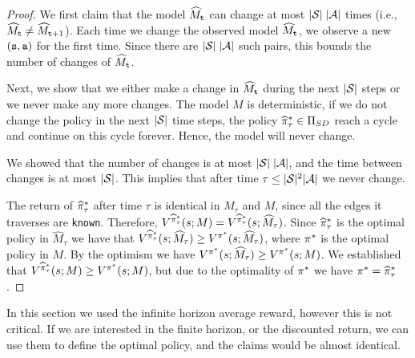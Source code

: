 \begin{proof}
We first claim that the model $\widehat{M}_{\tt t}$ can change  at
most $|\mathcal{S}|\;|\mathcal{A}|$ times (i.e.,  $\widehat{M}_{\tt t} \neq
\widehat{M}_{{\tt t}+1}$). Each time we change the observed model
$\widehat{M}_{\tt t}$, we observe a new $({\tt s},{\tt a})$ for the
first time. Since there are $|\mathcal{S}|\;|\mathcal{A}|$ such pairs, this
bounds the number of changes of  $\widehat{M}_{\tt t}$.

Next, we show that we either make a change in $\widehat{M}_{\tt t}$
during the next $|\mathcal{S}|$ steps or we never make any more changes.
The model $M$ is deterministic, if we do not change the policy in
the next $|\mathcal{S}|$ time steps, the policy
$\widehat{\pi}^*_\tau \in {\Pi _{SD}}$ reach a cycle and
continue on this cycle forever. Hence, the model will never change.

We showed that the number of changes is at most
$|\mathcal{S}|\;|\mathcal{A}|$, and the time between changes is at most
$|\mathcal{S}|$. This implies that after time $\tau\leq
|\mathcal{S}|^2|\mathcal{A}|$ we never change.

The return of $\widehat{\pi}^*_\tau$ after time $\tau$
is identical in $\widehat{M}_\tau$ and $M$, since all the edges
it traverses are \texttt{known}. Therefore, $V^{\widehat{\pi}^*_\tau}(s;M)=V^{\widehat{\pi}^*_\tau}(s;\widehat{M}_\tau)$. Since $\widehat{\pi}^*_\tau$ is the optimal policy in $\widehat{M}_\tau$ we have that $V^{\widehat{\pi}^*_\tau}(s;\widehat{M}_\tau)\geq V^{\pi^*}(s;\widehat{M}_\tau)$, where $\pi^*$ is the optimal policy in $M$. By the optimism we have $ V^{\pi^*}(s;\widehat{M}_\tau)\geq  V^{\pi^*}(s;M) $. We established that $ V^{\widehat{\pi}^*_\tau}(s;M) \geq V^{\pi^*}(s;M) $, but due to the optimality of $\pi^*$ we have $\pi^*=\widehat{\pi}^*_\tau$.
%
\end{proof}

In this section we used the infinite horizon average reward, however
this is not critical. If we are interested in the finite horizon, or
the discounted return, we can use them to define the optimal policy,
and the claims would be almost identical.



